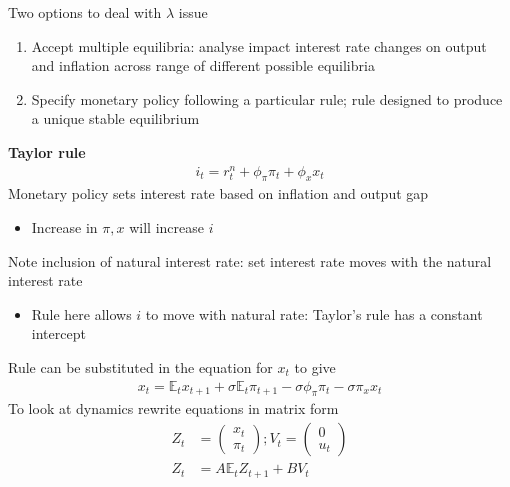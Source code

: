 \documentclass{beamer}
\begin{document}
\begin{frame}
  Two options to deal with $\lambda$ issue
\begin{enumerate}
  \item Accept multiple equilibria: analyse impact interest rate changes on output and inflation across range of different possible equilibria
  \item Specify monetary policy following a particular rule; rule designed to produce a unique stable equilibrium
\end{enumerate}
\end{frame}

\begin{frame}
  \textbf{Taylor rule}  
\begin{align} 
  i_t=r_t^n+ \phi_{\pi}\pi_t+\phi_xx_t 
\end{align}
 \medskip
  Monetary policy sets interest rate based on inflation and output gap
  \begin{itemize}
    \item Increase in $\pi,x$ will increase $i$    
  \end{itemize}
  \medskip
 Note inclusion of natural interest rate: set interest rate moves with the natural interest rate
 \begin{itemize}
   \item Rule here allows $i$ to move with natural rate: Taylor's rule has a constant intercept
 \end{itemize}
\end{frame}

\begin{frame}
  Rule can be substituted in the equation for $x_t$ to give
\begin{align}  
  x_t=\mathbb{E}_tx_{t+1} + \sigma \mathbb{E}_t \pi_{t+1} - \sigma\phi_{\pi}\pi_t -\sigma\pi_x x_t 
\end{align}  
 To look at dynamics rewrite equations in matrix form
 \begin{align}
  Z_t&=\begin{pmatrix} x_t \\ \pi_t \end{pmatrix}; V_t=\begin{pmatrix}  0 \\u_t \end{pmatrix} \\
  Z_t&=A\mathbb{E}_tZ_{t+1}+BV_t 
 \end{align}
\end{frame}
\end{document}
